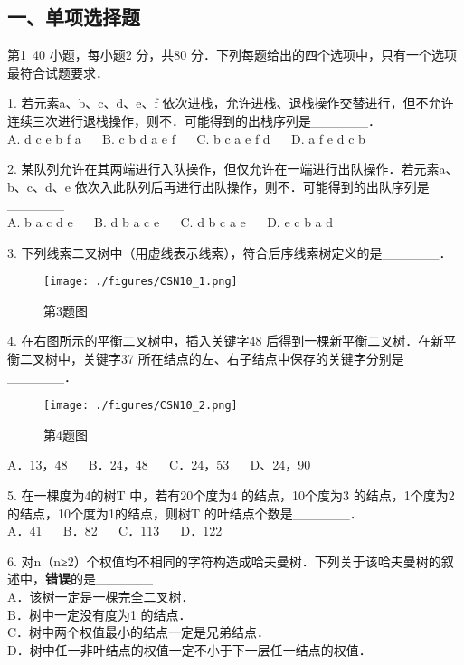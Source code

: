 
\subsection{一、单项选择题}
第1~40 小题，每小题2 分，共80 分．下列每题给出的四个选项中，只有一个选项最符合试题要求．

1. 若元素a、b、c、d、e、f 依次进栈，允许进栈、退栈操作交替进行，但不允许连续三次进行退栈操作，则不．可能得到的出栈序列是______． \\
A. d c e b f a $\quad$ B. c b d a e f $\quad$ C. b c a e f d $\quad$ D. a f e d c b

2. 某队列允许在其两端进行入队操作，但仅允许在一端进行出队操作．若元素a、b、c、d、e 依次入此队列后再进行出队操作，则不．可能得到的出队序列是______ \\
A. b a c d e $\quad$ B. d b a c e $\quad$ C. d b c a e $\quad$ D. e c b a d

3. 下列线索二叉树中（用虚线表示线索），符合后序线索树定义的是______．\\
\begin{figure}[ht]
\centering
\texttt{[image: ./figures/CSN10\_1.png]}
\caption{第3题图} \label{CSN10_fig1}
\end{figure}

4. 在右图所示的平衡二叉树中，插入关键字48 后得到一棵新平衡二叉树．在新平衡二叉树中，关键字37 所在结点的左、右子结点中保存的关键字分别是______． \\
\begin{figure}[ht]
\centering
\texttt{[image: ./figures/CSN10\_2.png]}
\caption{第4题图} \label{CSN10_fig2}
\end{figure}
A．13，48 $\quad$ B．24，48 $\quad$ C．24，53 $\quad$ D、24，90

5. 在一棵度为4的树T 中，若有20个度为4 的结点，10个度为3 的结点，1个度为2 的结点，10个度为1的结点，则树T 的叶结点个数是______． \\
A．41 $\quad$ B．82 $\quad$ C．113 $\quad$ D．122

6. 对n（n≥2）个权值均不相同的字符构造成哈夫曼树．下列关于该哈夫曼树的叙述中，\textbf{错误}的是______ \\
A．该树一定是一棵完全二叉树． \\
B．树中一定没有度为1 的结点． \\
C．树中两个权值最小的结点一定是兄弟结点． \\
D．树中任一非叶结点的权值一定不小于下一层任一结点的权值．

